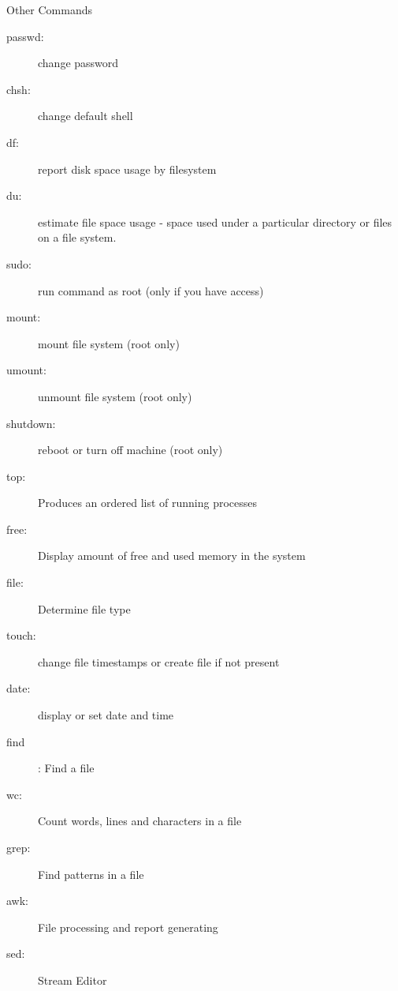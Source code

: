 \documentclass[10pt,t]{beamer}
\begin{document}
\begin{frame}{Other Commands}
  \begin{description}
    \item[passwd:] change password %
    \item[chsh:] change default shell %
    \item[df:] report disk space usage by filesystem
    \item[du:] estimate file space usage - space used under a particular directory or files on a file system.
    \item[sudo:] run command as root (\alert{only if you have access})
    \item[mount:] mount file system (\alert{root only})
    \item[umount:] unmount file system (\alert{root only})
    \item[shutdown:] reboot or turn off machine (\alert{root only})
    \item[top:] Produces an ordered list of running processes
    \item[free:] Display amount of free and used memory in the system
    \item[file:] Determine file type
    \item[touch:] change file timestamps or create file if not present
    \item[date:] display or set date and time
    \item[find]: Find a file
    \item[] 
    \item[wc:] Count words, lines and characters in a file
    \item[] 
    \item[grep:] Find patterns in a file
    \item[] 
    \item[awk:] File processing and report generating
    \item[] 
    \item[sed:] Stream Editor
    \item[] 

\end{description}
\end{frame}
\end{document}
